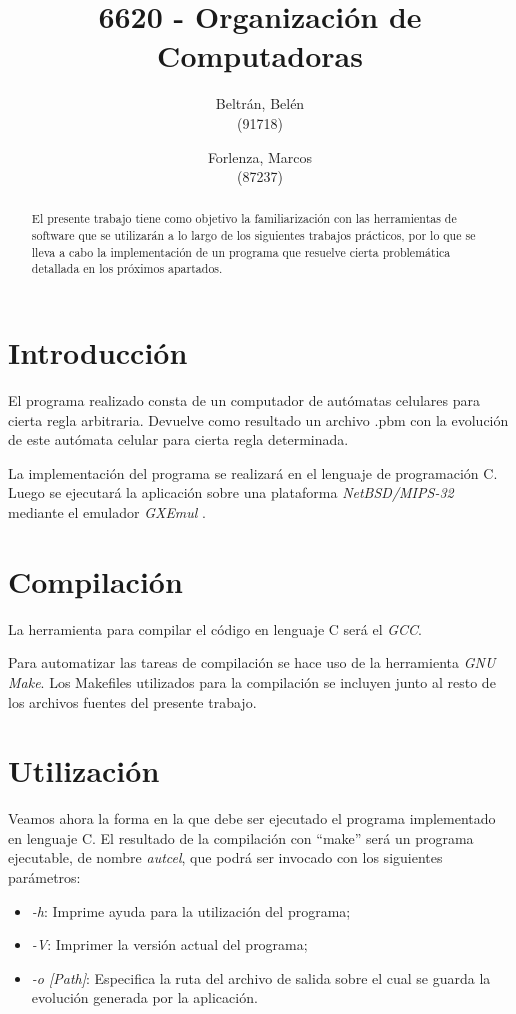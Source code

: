 \documentclass[9pt,a4paper]{article}
\title{6620 - Organización de Computadoras}
\author{Beltrán, Belén \\ (91718) \and Forlenza, Marcos \\ (87237)}
\begin{document}
\date{}

\maketitle
\thispagestyle{empty}
\begin{abstract}
El presente trabajo tiene como objetivo la familiarización con las herramientas de software que se utilizarán a lo largo de los siguientes trabajos prácticos, por lo que se lleva a cabo la implementación de un programa que resuelve cierta problemática detallada en los próximos apartados.
\end{abstract}

\tableofcontents
\pagebreak

\section{Introducción}
El programa realizado consta de un computador de autómatas celulares para cierta regla arbitraria. Devuelve como resultado un archivo .pbm con la evolución de este autómata celular para cierta regla determinada.
\par
La implementación del programa se realizará en el lenguaje de programación C. Luego se ejecutará la aplicación sobre una plataforma \textit{NetBSD/MIPS-32} mediante el emulador \textit{GXEmul} \cite{GXEMUL}. 
\bigskip

\section{Compilación}
	
	La herramienta para compilar el código en lenguaje C será el \textit{GCC}.
	\par
	Para automatizar las tareas de compilación se hace uso de la herramienta \textit{GNU Make}. Los Makefiles utilizados para la compilación se incluyen junto al resto de los archivos fuentes del presente trabajo.
\bigskip

\section{Utilización}
	
Veamos ahora la forma en la que debe ser ejecutado el programa implementado en lenguaje C. El resultado de la compilación con ``make'' será un programa ejecutable, de nombre \textit{autcel}, que podrá ser invocado con los siguientes parámetros:
\medskip

\begin{itemize}

\itemsep=2pt \topsep=0pt \partopsep=0pt \parskip=0pt \parsep=0pt
\item \textit{-h}:  Imprime ayuda para la utilización del programa;
\item \textit{-V}:  Imprimer la versión actual del programa;
\item \textit{-o [Path]}: Especifica la ruta del archivo de salida sobre el cual se guarda la evolución generada por la aplicación.

\end{itemize}
\end{document}
